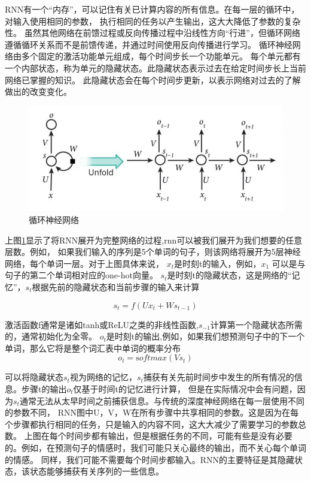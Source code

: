 RNN有一个“内存”，可以记住有关已计算内容的所有信息。在每一层的循环中，对输入使用相同的参数，
执行相同的任务以产生输出，这大大降低了参数的复杂性。
虽然其他网络在前馈过程或反向传播过程中沿线性方向“行进”，但循环网络遵循循环关系而不是前馈传递，并通过时间使用反向传播进行学习。
循环神经网络由多个固定的激活功能单元组成，每个时间步长一个功能单元。
每个单元都有一个内部状态，称为单元的隐藏状态。此隐藏状态表示过去在给定时间步长上当前网络已掌握的知识。
此隐藏状态会在每个时间步更新，以表示网络对过去的了解做出的改变变化。

\begin{figure}[htbp]
  \centering
  \includegraphics[scale=0.5]{./images/rnn.jpg}
  \caption{循环神经网络}
  \label{fig:rnn}
\end{figure}

上图\ref{fig:rnn}显示了将RNN展开为完整网络的过程,rnn可以被我们展开为我们想要的任意层数。例如，
如果我们输入的序列是5个单词的句子，则该网络将展开为5层神经网络，每个单词一层。对于上图具体来说，
$x_{t}$是时刻t的输入，例如，$x_{1}$ 可以是与句子的第二个单词相对应的one-hot向量。
$s_{t}$是时刻t的隐藏状态，这是网络的“记忆”，$s_{t}$根据先前的隐藏状态和当前步骤的输入来计算

\begin{equation}
  s_{t}=f(U x_{t}+W s_{t-1})
  \end{equation}

激活函数f通常是诸如tanh或ReLU之类的非线性函数,$s_{-1}$计算第一个隐藏状态所需的，通常初始化为全零。
$o_{t}$是时刻t的输出,例如，如果我们想预测句子中的下一个单词，那么它将是整个词汇表中单词的概率分布
\begin{equation}
  o_t = \mathrm softmax (V s_t)
  \end{equation}

  可以将隐藏状态$s_{t}$视为网络的记忆，$s_{t}$捕获有关先前时间步中发生的所有情况的信息。步骤t的输出$o_{t}$仅基于时间t的记忆进行计算，
  但是在实际情况中会有问题，因为$s_{t}$通常无法从太早时间之前捕获信息。与传统的深度神经网络在每一层使用不同的参数不同，
  RNN图中U，V，W在所有步骤中共享相同的参数。这是因为在每个步骤都执行相同的任务，只是输入的内容不同，这大大减少了需要学习的参数总数。
  上图在每个时间步都有输出，但是根据任务的不同，可能有些是没有必要的。例如，在预测句子的情感时，我们可能只关心最终的输出，而不关心每个单词的情感。
  同样，我们可能不需要每个时间步都输入。RNN的主要特征是其隐藏状态，该状态能够捕获有关序列的一些信息。


